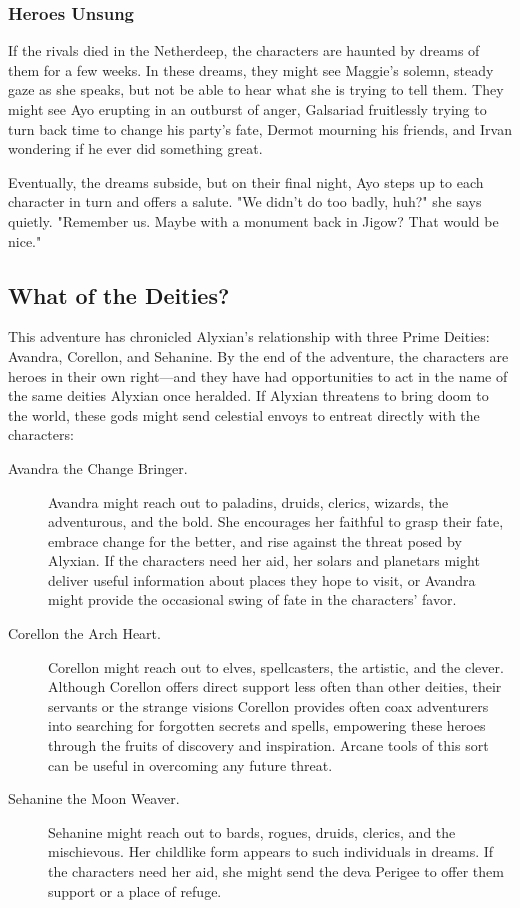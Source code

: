 \documentclass[10pt,a4paper,twoside,fancy,bg=print,twocolumn,openany,nodeprecatedcode]{dndbook}
\begin{document}
\subsubsection{Heroes Unsung}
If the rivals died in the Netherdeep, the characters are haunted by dreams of them for a few weeks. In these dreams, they might see Maggie's solemn, steady gaze as she speaks, but not be able to hear what she is trying to tell them. They might see Ayo erupting in an outburst of anger, Galsariad fruitlessly trying to turn back time to change his party's fate, Dermot mourning his friends, and Irvan wondering if he ever did something great.

Eventually, the dreams subside, but on their final night, Ayo steps up to each character in turn and offers a salute. "We didn't do too badly, huh?" she says quietly. "Remember us. Maybe with a monument back in Jigow? That would be nice."

\subsection{What of the Deities?}
This adventure has chronicled Alyxian's relationship with three Prime Deities: Avandra, Corellon, and Sehanine. By the end of the adventure, the characters are heroes in their own right—and they have had opportunities to act in the name of the same deities Alyxian once heralded. If Alyxian threatens to bring doom to the world, these gods might send celestial envoys to entreat directly with the characters:


\begin{description}
\item[Avandra the Change Bringer.]
Avandra might reach out to paladins, druids, clerics, wizards, the adventurous, and the bold. She encourages her faithful to grasp their fate, embrace change for the better, and rise against the threat posed by Alyxian. If the characters need her aid, her solars and planetars might deliver useful information about places they hope to visit, or Avandra might provide the occasional swing of fate in the characters' favor.
\item[Corellon the Arch Heart.]
Corellon might reach out to elves, spellcasters, the artistic, and the clever. Although Corellon offers direct support less often than other deities, their servants or the strange visions Corellon provides often coax adventurers into searching for forgotten secrets and spells, empowering these heroes through the fruits of discovery and inspiration. Arcane tools of this sort can be useful in overcoming any future threat.
\item[Sehanine the Moon Weaver.]
Sehanine might reach out to bards, rogues, druids, clerics, and the mischievous. Her childlike form appears to such individuals in dreams. If the characters need her aid, she might send the deva Perigee to offer them support or a place of refuge.
\end{description}
\end{document}
